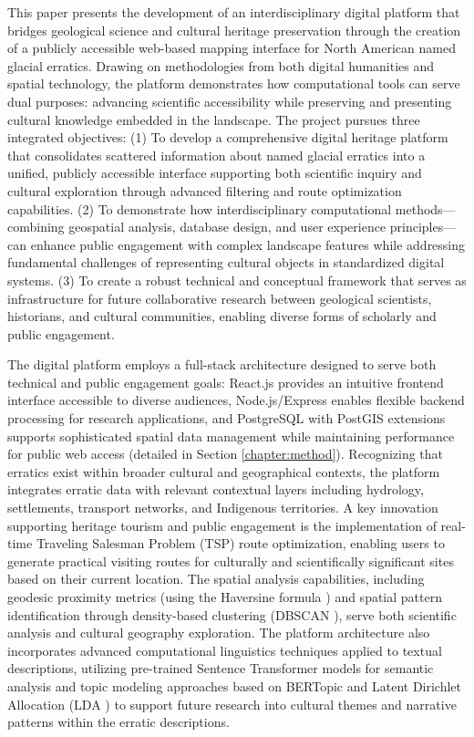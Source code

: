This paper presents the development of an interdisciplinary digital platform that bridges geological science and cultural heritage preservation through the creation of a publicly accessible web-based mapping interface for North American named glacial erratics. Drawing on methodologies from both digital humanities and spatial technology, the platform demonstrates how computational tools can serve dual purposes: advancing scientific accessibility while preserving and presenting cultural knowledge embedded in the landscape. The project pursues three integrated objectives: (1) To develop a comprehensive digital heritage platform that consolidates scattered information about named glacial erratics into a unified, publicly accessible interface supporting both scientific inquiry and cultural exploration through advanced filtering and route optimization capabilities. (2) To demonstrate how interdisciplinary computational methods—combining geospatial analysis, database design, and user experience principles—can enhance public engagement with complex landscape features while addressing fundamental challenges of representing cultural objects in standardized digital systems. (3) To create a robust technical and conceptual framework that serves as infrastructure for future collaborative research between geological scientists, historians, and cultural communities, enabling diverse forms of scholarly and public engagement.

The digital platform employs a full-stack architecture designed to serve both technical and public engagement goals: React.js provides an intuitive frontend interface accessible to diverse audiences, Node.js/Express enables flexible backend processing for research applications, and PostgreSQL with PostGIS extensions supports sophisticated spatial data management while maintaining performance for public web access (detailed in Section \ref{chapter:method}). Recognizing that erratics exist within broader cultural and geographical contexts, the platform integrates erratic data with relevant contextual layers including hydrology, settlements, transport networks, and Indigenous territories. A key innovation supporting heritage tourism and public engagement is the implementation of real-time Traveling Salesman Problem (TSP) route optimization, enabling users to generate practical visiting routes for culturally and scientifically significant sites based on their current location. The spatial analysis capabilities, including geodesic proximity metrics (using the Haversine formula \cite{Sinnott1984}) and spatial pattern identification through density-based clustering (DBSCAN \cite{Ester1996}), serve both scientific analysis and cultural geography exploration. The platform architecture also incorporates advanced computational linguistics techniques applied to textual descriptions, utilizing pre-trained Sentence Transformer models \cite{Reimers2019} for semantic analysis and topic modeling approaches based on BERTopic \cite{Grootendorst2022} and Latent Dirichlet Allocation (LDA \cite{Blei2003}) to support future research into cultural themes and narrative patterns within the erratic descriptions.

